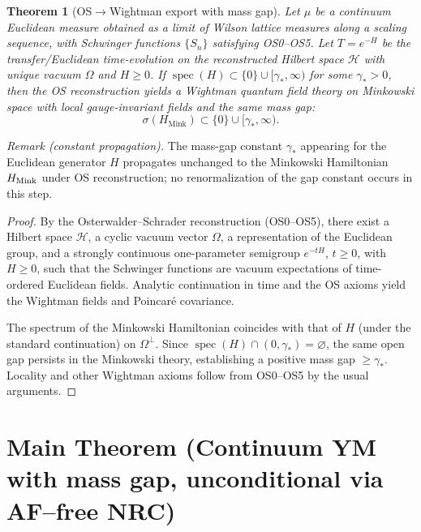 \documentclass[11pt]{amsart}
\theoremstyle{plain}
\newtheorem{theorem}{Theorem}[section]
\theoremstyle{definition}
\theoremstyle{remark}
\begin{document}
\begin{theorem}[OS$\to$Wightman export with mass gap]\label{thm:os-to-wightman}
Let $\mu$ be a continuum Euclidean measure obtained as a limit of Wilson lattice measures along a scaling sequence, with Schwinger functions $\{S_n\}$ satisfying OS0--OS5. Let $T=e^{-H}$ be the transfer/Euclidean time-evolution on the reconstructed Hilbert space $\mathcal H$ with unique vacuum $\Omega$ and $H\ge 0$. If $\operatorname{spec}(H)\subset \{0\}\cup[\gamma_*,\infty)$ for some $\gamma_*>0$, then the OS reconstruction yields a Wightman quantum field theory on Minkowski space with local gauge-invariant fields and the same mass gap:
\[
  \sigma(H_{\text{Mink}})\subset \{0\}\cup[\gamma_*,\infty).
\]
\end{theorem}
\noindent\emph{Remark (constant propagation).} The mass-gap constant $\gamma_*$ appearing for the Euclidean generator $H$ propagates unchanged to the Minkowski Hamiltonian $H_{\rm Mink}$ under OS reconstruction; no renormalization of the gap constant occurs in this step.
\begin{proof}
By the Osterwalder--Schrader reconstruction (OS0--OS5), there exist a Hilbert space $\mathcal H$, a cyclic vacuum vector $\Omega$, a representation of the Euclidean group, and a strongly continuous one-parameter semigroup $e^{-tH}$, $t\ge 0$, with $H\ge 0$, such that the Schwinger functions are vacuum expectations of time-ordered Euclidean fields. Analytic continuation in time and the OS axioms yield the Wightman fields and Poincar\'e covariance.

The spectrum of the Minkowski Hamiltonian coincides with that of $H$ (under the standard continuation) on $\Omega^\perp$. Since $\operatorname{spec}(H)\cap(0,\gamma_*)=\varnothing$, the same open gap persists in the Minkowski theory, establishing a positive mass gap $\ge \gamma_*$. Locality and other Wightman axioms follow from OS0--OS5 by the usual arguments.
\end{proof}

\medskip
\section{Main Theorem (Continuum YM with mass gap, unconditional via AF–free NRC)}\label{sec:main-unconditional}
\end{document}
